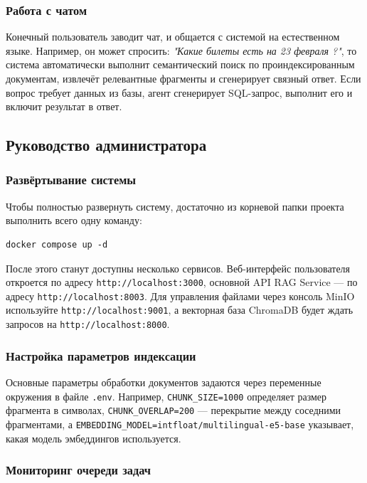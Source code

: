 \subsubsection{Работа с чатом}

Конечный пользователь заводит чат, и общается с системой на естественном языке. Например, он может спросить: \textit{"Какие билеты есть на 23 февраля ?"}, то система автоматически выполнит семантический поиск по проиндексированным документам, извлечёт релевантные фрагменты и сгенерирует связный ответ. Если вопрос требует данных из базы, агент сгенерирует SQL-запрос, выполнит его и включит результат в ответ. 

\subsection{Руководство администратора}

\subsubsection{Развёртывание системы}

Чтобы полностью развернуть систему, достаточно из корневой папки проекта выполнить всего одну команду:

\begin{verbatim}
docker compose up -d
\end{verbatim}

После этого станут доступны несколько сервисов. Веб-интерфейс пользователя откроется по адресу \texttt{http://localhost:3000}, основной API RAG Service — по адресу \texttt{http://localhost:8003}. Для управления файлами через консоль MinIO используйте \texttt{http://localhost:9001}, а векторная база ChromaDB будет ждать запросов на \texttt{http://localhost:8000}.

\subsubsection{Настройка параметров индексации}

Основные параметры обработки документов задаются через переменные окружения в файле \texttt{.env}. Например, \texttt{CHUNK\_SIZE=1000} определяет размер фрагмента в символах, \texttt{CHUNK\_OVERLAP=200} — перекрытие между соседними фрагментами, а \texttt{EMBEDDING\_MODEL=intfloat/multilingual-e5-base} указывает, какая модель эмбеддингов используется.

\subsubsection{Мониторинг очереди задач}

